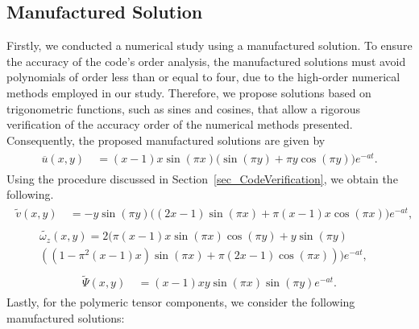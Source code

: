 \documentclass[preprint, 12pt]{elsarticle}
\begin{document}
\subsection{Manufactured Solution}

Firstly, we conducted a numerical study using a manufactured solution. To
ensure the accuracy of the code's order analysis, the manufactured solutions
must avoid polynomials of order less than or equal to four, due to the
high-order numerical methods employed in our study. Therefore, we propose
solutions based on trigonometric functions, such as sines and cosines, that
allow a rigorous verification of the accuracy order of the numerical methods
presented. Consequently, the proposed manufactured solutions are given by
\begin{gather}
    \begin{aligned}
        \overline{u}(x,y) &~= (x-1) x \sin(\pi x) \bigg(\sin(\pi y)+\pi y \cos(\pi y)\bigg) e^{-a t}.\label{eq:u_case0_2}
    \end{aligned}
\end{gather}
Using the procedure discussed in Section~\ref{sec_CodeVerification}, we obtain the following.
\begin{gather}
    \begin{aligned}
        \widetilde{v}(x,y) &~= -y\sin(\pi y)\bigg((2x-1)\sin(\pi x)+\pi(x-1)x\cos(\pi x)\bigg)e^{-a t},\label{eq:v_case0_2}
    \end{aligned}
\end{gather}
\begin{gather}
    \begin{aligned}
        \widetilde{\omega_{z}}(x,y) = 2\bigg(\pi(x-1)x\sin(\pi x)\cos(\pi y)+y\sin(\pi y) &~ \\ \left(\left(1-\pi^2(x-1)x\right)\sin(\pi x)+\pi(2x - 1)\cos(\pi x)\right)\bigg)e^{-a t},\label{eq:wz_case0_2}
    \end{aligned}
\end{gather}
\begin{gather}
    \begin{aligned}
        \widetilde{\Psi}(x,y) &~= (x-1) x y\sin(\pi x)\sin(\pi y) e^{-a t}.\label{eq:psi_case0_2}
    \end{aligned}
\end{gather}
Lastly, for the polymeric tensor components, we consider the following manufactured solutions:
\end{document}
